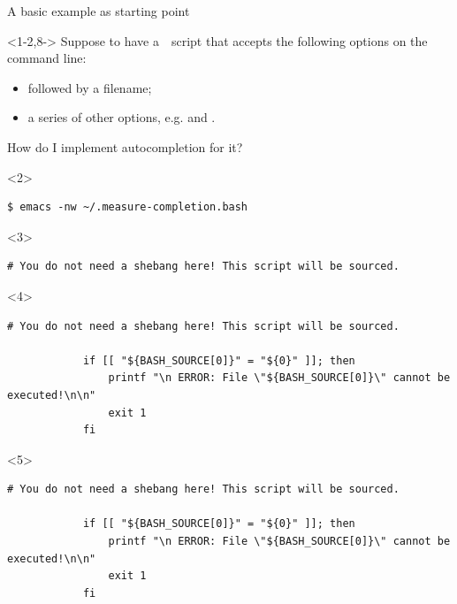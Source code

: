 \begin{frame}[fragile]{A basic example as starting point}
    \vspace{-1mm}
    \begin{onlyenv}<1-2,8->
        Suppose to have a \,\, script that accepts the following options on the command line:
        \begin{itemize}
            \item {} followed by a filename;
            \item a series of other options, e.g.  and .
        \end{itemize}
        How do I implement autocompletion for it?
        \begin{onlyenv}<2>
            \begin{lstlisting}[style=myBash, numbers=none, aboveskip=4mm]
                $ emacs -nw ~/.measure-completion.bash
            \end{lstlisting}
        \end{onlyenv}
    \end{onlyenv}
    \begin{onlyenv}<3>
        \begin{lstlisting}[style=myBash, numbers=none, style=smaller]
            # You do not need a shebang here! This script will be sourced.
        \end{lstlisting}
    \end{onlyenv}
    \begin{onlyenv}<4>
        \begin{lstlisting}[style=myBash, numbers=none, style=smaller]
            # You do not need a shebang here! This script will be sourced.

            if [[ "${BASH_SOURCE[0]}" = "${0}" ]]; then
                printf "\n ERROR: File \"${BASH_SOURCE[0]}\" cannot be executed!\n\n"
                exit 1
            fi
        \end{lstlisting}
    \end{onlyenv}
    \begin{onlyenv}<5>
        \begin{lstlisting}[style=myBash, numbers=none, style=smaller]
            # You do not need a shebang here! This script will be sourced.

            if [[ "${BASH_SOURCE[0]}" = "${0}" ]]; then
                printf "\n ERROR: File \"${BASH_SOURCE[0]}\" cannot be executed!\n\n"
                exit 1
            fi


\end{lstlisting}
\end{onlyenv}
\end{frame}
